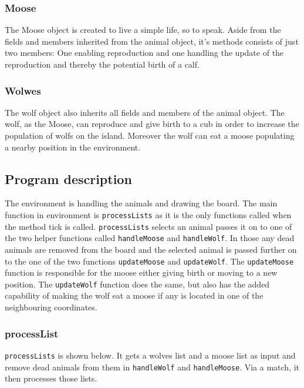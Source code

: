 \documentclass[a4paper]{report}
\begin{document}
\subsubsection*{Moose}
The Moose object is created to live a simple life, so to speak. Aside from the fields and members inherited from the animal object, it's methods consists of just two members: One enabling reproduction and one handling the update of the reproduction and thereby the potential birth of a calf.

\subsubsection*{Wolwes}
The wolf object also inherits all fields and members of the animal object. The wolf, as the Moose, can reproduce and give birth to a cub in order to increase the population of wolfs on the island. Moreover the wolf can eat a moose populating a nearby position in the environment. 







\subsection*{Program description}

The environment is handling the animals and drawing the board. The main function in environment is \texttt{processLists}  as it is the only functions called when the method tick is called.
\texttt{processLists} selects an animal passes it on to one of the two helper functions called \texttt{handleMoose}  and \texttt{handleWolf}. In those any dead animals are removed from the board and the selected animal is passed further on to the one of the two functions \texttt{updateMoose} and \texttt{updateWolf}. The \texttt{updateMoose} function is responsible for the moose either giving birth or moving to a new position.
The \texttt{updateWolf} function does the same, but also has the added capability of making the wolf eat a moose if any is located in one of the neighbouring coordinates.

\subsubsection*{processList}
\texttt{processLists} is shown below. It gets a wolves list and a moose list as input and remove dead animals from them in \texttt{handleWolf} and \texttt{handleMoose}. Via a match, it then processes those lists.
\end{document}
